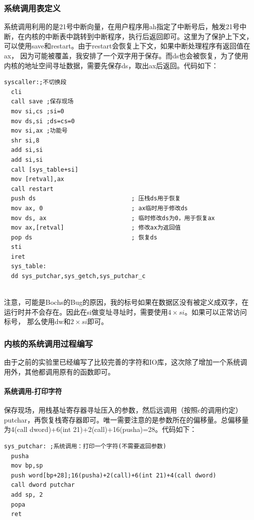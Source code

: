 \documentclass[a4paper, 11pt]{article} %
\begin{document}
\subsubsection{系统调用表定义}
系统调用利用的是21号中断向量，在用户程序用ah指定了中断号后，触发21号中断，在内核的中断表中跳转到中断程序，执行后返回即可。这里为了保护上下文，可以使用save和restart。由于restart会恢复上下文，如果中断处理程序有返回值在ax，
因为可能被覆盖，我安排了一个双字用于保存。而ds也会被恢复，为了使用内核的地址空间寻址数据，需要先保存ds，取出ax后返回。代码如下：
\begin{lstlisting}[language={[x86masm]Assembler},label=syscaller,caption=syscaller]
  syscaller:;不切换段
  cli
  call save ;保存现场
  mov si,cs ;si=0
  mov ds,si ;ds=cs=0
  mov si,ax ;功能号
  shr si,8
  add si,si
  add si,si
  call [sys_table+si]
  mov [retval],ax
  call restart
  push ds                           ; 压栈ds用于恢复
  mov ax, 0                         ; ax临时用于修改ds
  mov ds, ax                        ; 临时修改ds为0，用于恢复ax
  mov ax,[retval]                   ; 修改ax为返回值
  pop ds                            ; 恢复ds
  sti
  iret
  sys_table:
  dd sys_putchar,sys_getch,sys_putchar_c
  
\end{lstlisting}
注意，可能是Bochs的Bug的原因，我的标号如果在数据区没有被定义成双字，在运行时并不会存在。因此在si做变址寻址时，需要使用$ 4\times si $。如果可以正常访问标号，
那么使用dw和$ 2\times si $即可。

\subsubsection{内核的系统调用过程编写}
由于之前的实验里已经编写了比较完善的字符和IO库，这次除了增加一个系统调用外，其他都调用原有的函数即可。
\paragraph{系统调用-打印字符}
保存现场，用栈基址寄存器寻址压入的参数，然后远调用（按照c的调用约定）putchar，再恢复栈寄存器即可。唯一需要注意的是参数所在的偏移量。总偏移量为4(call dword)+6(int 21)+2(call)+16(pusha)=28。代码如下：
\begin{lstlisting}[language={[x86masm]Assembler},label=sysputchar,caption=系统调用打印字符过程]
  sys_putchar: ;系统调用：打印一个字符(不需要返回参数)
  pusha
  mov bp,sp
  push word[bp+28];16(pusha)+2(call)+6(int 21)+4(call dword)
  call dword putchar
  add sp, 2
  popa
  ret  
\end{lstlisting}
\end{document}
